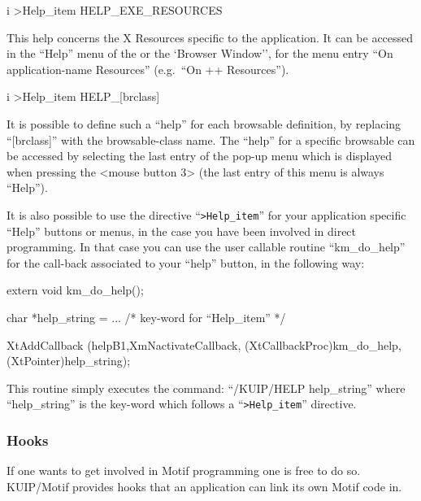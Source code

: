 \begin{Gray}{i}
>Help_item  HELP_EXE_RESOURCES
\end{Gray}
This help concerns the X Resources specific to the application. It can be
accessed in the ``Help'' menu of the \EW{} or the
`Browser Window'', for the menu entry ``On application-name Resources''
(e.g.\ ``On \PAW++{} Resources'').
 
\begin{Gray}{i}
>Help_item  HELP_[brclass]
\end{Gray}
It is possible to define such a ``help'' for each browsable definition,
by replacing ``[brclass]'' with the browsable-class name.
The ``help'' for a specific browsable can be accessed by selecting the
last entry of the pop-up menu which is displayed when pressing the <mouse
button 3> (the last entry of this menu is always ``Help'').
 
 
It is also possible to use the \CDF{} directive ``{\tt >Help\_item}'' for
your application specific ``Help'' buttons or menus, in the case
you have been involved in direct \Motif{} programming. In that case
you can use the \KUIPMotif{} user callable routine ``km\_do\_help'' for
the call-back associated to your ``help'' button, in the following
way:
 
\begin{XMP}
    extern void km_do_help();
 
    char *help_string = ...  /* key-word for ``Help_item'' */
 
    XtAddCallback (helpB1,XmNactivateCallback,
                   (XtCallbackProc)km_do_help,(XtPointer)help_string);
\end{XMP}
 
This routine simply executes the \KUIP{} command: ``/KUIP/HELP help\_string''
where ``help\_string'' is the key-word which follows a ``{\tt >Help\_item}''
directive.
 
\subsubsection{Hooks}
\label{ref:rehooks}

If one wants to get involved in Motif programming one is free to do so.
KUIP/Motif provides hooks that an application can link its own Motif
code in.
 
